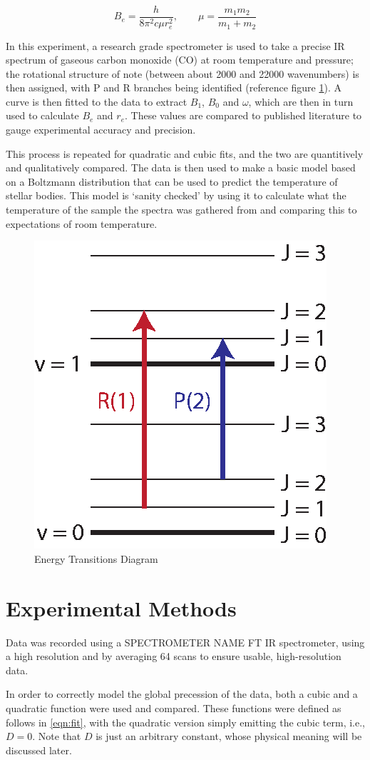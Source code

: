 \documentclass[aps,prl,reprint,10pt,amsmath,amssymb,superscriptaddress,a4paper]{revtex4-2}
\begin{document}
\begin{equation}
\label{eqn:B}
B_e = \frac{h}{8 \pi^2 c \mu r_e^2}, \qquad \mu = \frac{m_1 m_2}{m_1 + m_2} 
\end{equation}

In this experiment, a research grade spectrometer is used to take a precise IR spectrum of gaseous carbon monoxide (CO) at room temperature and pressure; the rotational structure of note (between about 2000 and 22000 wavenumbers) is then assigned, with P and R branches being identified (reference figure \ref{fig:transitions}). A curve is then fitted to the data to extract $B_1$, $B_0$ and $\omega$, which are then in turn used to calculate $B_e$ and $r_e$. These values are compared to published literature to gauge experimental accuracy and precision.

This process is repeated for quadratic and cubic fits, and the two are quantitively and qualitatively compared. The data is then used to make a basic model based on a Boltzmann distribution that can be used to predict the temperature of stellar bodies. This model is ‘sanity checked’ by using it to calculate what the temperature of the sample the spectra was gathered from and comparing this to expectations of room temperature.

\begin{figure}[t]
\includegraphics[width = 5 cm]{Transitions.eps}
\caption{Energy Transitions Diagram}
\label{fig:transitions}
\end{figure}

\section{Experimental Methods}

Data was recorded using a {SPECTROMETER NAME} FT IR spectrometer, using a high resolution and by averaging 64 scans to ensure usable, high-resolution data.

In order to correctly model the global precession of the data, both a cubic and a quadratic function were used and compared. These functions were defined as follows in \ref{eqn:fit}, with the quadratic version simply emitting the cubic term, i.e., $ D = 0$. Note that $D$ is just an arbitrary constant, whose physical meaning will be discussed later.
\end{document}
